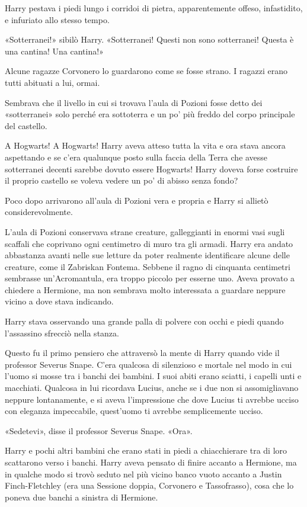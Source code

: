 Harry pestava i piedi lungo i corridoi di pietra, apparentemente offeso, infastidito, e infuriato allo stesso tempo.

«Sotterranei!» sibilò Harry. «Sotterranei! Questi non sono sotterranei! Questa è una cantina! Una cantina!»

Alcune ragazze Corvonero lo guardarono come se fosse strano. I ragazzi erano tutti abituati a lui, ormai.

Sembrava che il livello in cui si trovava l’aula di Pozioni fosse detto dei «sotterranei» solo perché era sottoterra e un po’ più freddo del corpo principale del castello.

A Hogwarts! A Hogwarts! Harry aveva atteso tutta la vita e ora stava ancora aspettando e se c’era qualunque posto sulla faccia della Terra che avesse sotterranei decenti sarebbe dovuto essere Hogwarts! Harry doveva forse costruire il proprio castello se voleva vedere un po’ di abisso senza fondo?

Poco dopo arrivarono all’aula di Pozioni vera e propria e Harry si allietò considerevolmente.

L’aula di Pozioni conservava strane creature, galleggianti in enormi vasi sugli scaffali che coprivano ogni centimetro di muro tra gli armadi. Harry era andato abbastanza avanti nelle sue letture da poter realmente identificare alcune delle creature, come il Zabriskan Fontema. Sebbene il ragno di cinquanta centimetri sembrasse un’Acromantula, era troppo piccolo per esserne uno. Aveva provato a chiedere a Hermione, ma non sembrava molto interessata a guardare neppure vicino a dove stava indicando.

Harry stava osservando una grande palla di polvere con occhi e piedi quando l’assassino sfrecciò nella stanza.

Questo fu il primo pensiero che attraversò la mente di Harry quando vide il professor Severus Snape. C’era qualcosa di silenzioso e mortale nel modo in cui l’uomo si mosse tra i banchi dei bambini. I suoi abiti erano sciatti, i capelli unti e macchiati. Qualcosa in lui ricordava Lucius, anche se i due non si assomigliavano neppure lontanamente, e si aveva l’impressione che dove Lucius ti avrebbe ucciso con eleganza impeccabile, quest’uomo ti avrebbe semplicemente ucciso.

«Sedetevi», disse il professor Severus Snape. «Ora».

Harry e pochi altri bambini che erano stati in piedi a chiacchierare tra di loro scattarono verso i banchi. Harry aveva pensato di finire accanto a Hermione, ma in qualche modo si trovò seduto nel più vicino banco vuoto accanto a Justin Finch-Fletchley (era una Sessione doppia, Corvonero e Tassofrasso), cosa che lo poneva due banchi a sinistra di Hermione.

